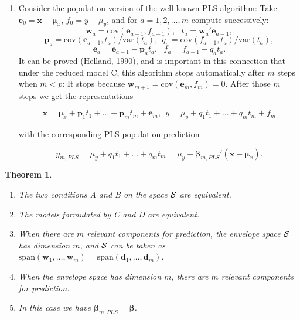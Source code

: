 \documentclass[a4paper, 11pt]{article}
\newtheorem{theorem}{Theorem} \newtheorem{principle}{Principle}
\begin{document}
\begin{enumerate}[label=\Alph*.]
\item Consider the  population version of the well known PLS algorithm: Take 
  $\bm{e}_{0}=\bm{x}-\bm{\mu}_{x}$, $f_{0}=y-\mu_{y}$, and for $a=1,2,...,m$ compute successively: 
  \begin{equation} \label{wt}\bm{w}_{a}=\mathrm{cov}(\bm{e}_{a-1}, f_{a-1}),\ \ \  
    t_{a}=\bm{w}_{a}'\bm{e}_{a-1},\end{equation}
  \begin{equation}\label{pq}\bm{p}_{a}=\mathrm{cov}(\bm{e}_{a-1}, t_{a})/\mathrm{var}(t_{a}),\ \ 
    q_{a}=\mathrm{cov}(f_{a-1},t_{a})/\mathrm{var}(t_{a}),\end{equation}
  \[\bm{e}_{a}=\bm{e}_{a-1}-\bm{p}_{a}t_{a},\ \ \ 
    f_{a}=f_{a-1}-q_{a}t_{a}.\]
  It can be proved (Helland, 1990), and is important in this connection that under the reduced model C, this algorithm stops automatically after $m$ steps when 
  $m<p$: It stops because $\bm{w}_{m+1}=\mathrm{cov}(\bm{e}_{m},f_{m})=0$. After those $m$ steps we get the representations

  \begin{equation}
    \label{latent}
    \bm{x}=\bm{\mu}_{x}+\bm{p}_{1}t_{1}+...+\bm{p}_{m}t_{m}+\bm{e}_{m},\ \ y=\mu_{y}+q_{1}t_{1}+...+q_{m}t_{m}+ f_{m}
  \end{equation}

  with the corresponding PLS population prediction

  \[y_{m,PLS}=\mu_{y}+q_{1}t_{1}+...+q_{m}t_{m}=\mu_{y}+\bm{\beta}_{m,PLS}'(\bm{x}-\bm{\mu}_{x}).\]

\end{enumerate}

\smallskip

\begin{theorem} {\rm\citep{cook2013envelopes,helland1990partial}}
  \begin{enumerate}[label=(\alph*)]
  \item The two conditions A and B on the space $\cal{S}$ are equivalent.
  \item The models formulated by C and D are equivalent.
  \item When there are $m$ relevant components for prediction, the envelope space $\cal{S}$ has dimension $m$, and $\cal{S}$ can be taken as $\mathrm{span}\left(\bm{w}_{1}, \ldots, \bm{w}_{m}\right) = \mathrm{span}\left(\bm{d}_{1}, \ldots, \bm{d}_{m}\right)$.
  \item When the envelope space has dimension $m$, there are $m$ relevant components for prediction.
  \item In this case we have $\bm{\beta}_{m,PLS}=\bm{\beta}$.
  \end{enumerate}
\end{theorem}
\end{document}
